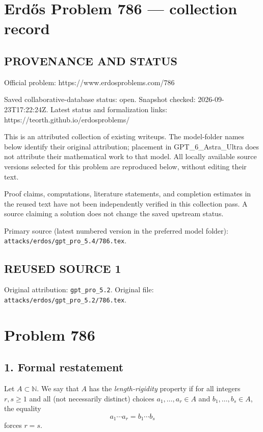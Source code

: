 \section*{Erd\H{o}s Problem 786 --- collection record}

\subsection*{PROVENANCE AND STATUS}
Official problem: https://www.erdosproblems.com/786

Saved collaborative-database status: open.
Snapshot checked: 2026-09-23T17:22:24Z.
Latest status and formalization links: https://teorth.github.io/erdosproblems/

This is an attributed collection of existing writeups. The model-folder names below identify their original attribution; placement in GPT\_6\_Astra\_Ultra does not attribute their mathematical work to that model. All locally available source versions selected for this problem are reproduced below, without editing their text.

Proof claims, computations, literature statements, and completion estimates in the reused text have not been independently verified in this collection pass. A source claiming a solution does not change the saved upstream status.

Primary source (latest numbered version in the preferred model folder): \texttt{attacks/erdos/gpt\_pro\_5.4/786.tex}.

\subsection*{REUSED SOURCE 1}
Original attribution: \texttt{gpt\_pro\_5.2}.
Original file: \texttt{attacks/erdos/gpt\_pro\_5.2/786.tex}.

\section*{Problem 786}

\subsection*{1. Formal restatement}
Let $A\subset \mathbb{N}$. We say that $A$ has the \emph{length-rigidity} property if for all integers $r,s\ge 1$ and all (not necessarily distinct) choices $a_1,\dots,a_r\in A$ and $b_1,\dots,b_s\in A$, the equality
\[
 a_1\cdots a_r=b_1\cdots b_s
\]
forces $r=s$.

